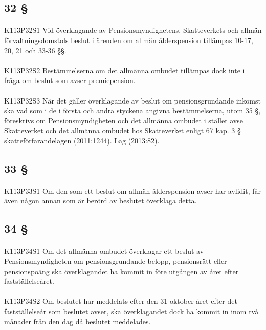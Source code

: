 \documentclass[a4paper,notitlepage,openany,10pt]{book}
\begin{document}
\subsection*{32 §}
\paragraph*{}
{\tiny K113P32S1}
Vid överklagande av Pensionsmyndighetens, Skatteverkets och allmän förvaltningsdomstols beslut i ärenden om allmän ålderspension tillämpas 10-17, 20, 21 och 33-36 §§.
\paragraph*{}
{\tiny K113P32S2}
Bestämmelserna om det allmänna ombudet tillämpas dock inte i fråga om beslut som avser premiepension.
\paragraph*{}
{\tiny K113P32S3}
När det gäller överklagande av beslut om pensionsgrundande inkomst ska vad som i de i första och andra styckena angivna bestämmelserna, utom 35 §, föreskrivs om Pensionsmyndigheten och det allmänna ombudet i stället avse Skatteverket och det allmänna ombudet hos Skatteverket enligt 67 kap. 3 § skatteförfarandelagen (2011:1244).
Lag (2013:82).
\subsection*{33 §}
\paragraph*{}
{\tiny K113P33S1}
Om den som ett beslut om allmän ålderspension avser har avlidit, får även någon annan som är berörd av beslutet överklaga detta.
\subsection*{34 §}
\paragraph*{}
{\tiny K113P34S1}
Om det allmänna ombudet överklagar ett beslut av Pensionsmyndigheten om pensionsgrundande belopp, pensionsrätt eller pensionspoäng ska överklagandet ha kommit in före utgången av året efter fastställelseåret.
\paragraph*{}
{\tiny K113P34S2}
Om beslutet har meddelats efter den 31 oktober året efter det fastställelseår som beslutet avser, ska överklagandet dock ha kommit in inom två månader från den dag då beslutet meddelades.
\end{document}
